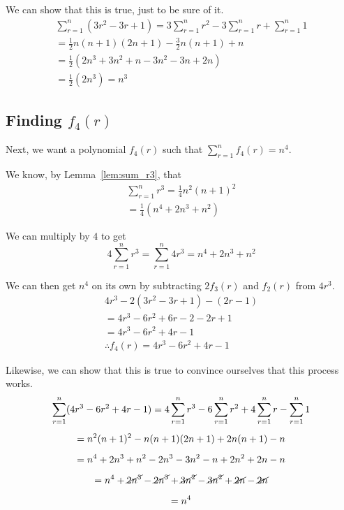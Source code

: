 \documentclass[a4paper]{article}
\newcommand{\sn}{\sum\limits_{r=1}^{n}}
\newcommand{\oo}[1]{\frac{1}{#1}}
\begin{document}
We can show that this is true, just to be sure of it.
\begin{gather*}
\sn (3r^2 - 3r + 1) = 3 \sn r^2 - 3 \sn r + \sn 1\\[0.5em]
= \frac{1}{2} n(n + 1)(2n + 1) - \frac{3}{2} n(n+1) + n\\[0.5em]
= \frac{1}{2} \left( 2n^3 + 3n^2 + n - 3n^2 - 3n + 2n \right)\\[0.5em]
= \frac{1}{2} \left( 2n^3  \right) = n^3
\end{gather*}

\subsection{Finding $f_4(r)$}

Next, we want a polynomial $f_4(r)$ such that $\sn f_4(r) = n^4$.

We know, by Lemma~\ref{lem:sum_r3}, that
\begin{gather*}
\sn r^3 = \oo{4}n^2(n + 1)^2\\[0.5em]
= \oo{4}\left(n^4 + 2n^3 + n^2\right)
\end{gather*}

We can multiply by $4$ to get $$4 \sn r^3 = \sn 4r^3 = n^4 + 2n^3 + n^2$$

We can then get $n^4$ on its own by subtracting $2f_3(r)$ and $f_2(r)$ from $4r^3$.
\begin{gather*}
4r^3 - 2\left(3r^2 - 3r + 1\right) - (2r - 1)\\[0.5em]
= 4r^3 - 6r^2 + 6r - 2 - 2r + 1\\[0.5em]
= 4r^3 - 6r^2 + 4r - 1\\[0.5em]
\therefore f_4(r) = 4r^3 - 6r^2 + 4r - 1
\end{gather*}

Likewise, we can show that this is true to convince ourselves that this process works.
\begin{gather*}
\sn (4r^3 - 6r^2 + 4r - 1) = 4 \sn r^3 - 6 \sn r^2 + 4 \sn r - \sn 1\\[0.5em]
= n^2(n + 1)^2 - n(n + 1)(2n + 1) + 2n(n + 1) - n\\[0.5em]
= n^4 + 2n^3 + n^2 - 2n^3 - 3n^2 - n + 2n^2 + 2n - n\\[0.5em]
= n^4 + \cancel{2n^3} - \cancel{2n^3} + \cancel{3n^2} - \cancel{3n^2} + \cancel{2n} - \cancel{2n}\\[0.5em]
= n^4
\end{gather*}

\newpage
\end{document}
